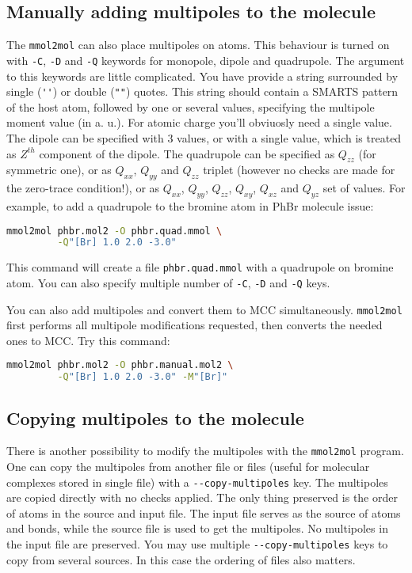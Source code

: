 \documentclass[10pt,a4paper]{article}
\begin{document}
\subsection{Manually adding multipoles to the molecule}
The \lstinline{mmol2mol} can also place multipoles on atoms. This behaviour is turned on 
with \lstinline{-C}, \lstinline{-D} and \lstinline{-Q} keywords for monopole, dipole and 
quadrupole. The argument to this keywords are little complicated. You have provide a 
string surrounded by single (\lstinline{''}) or double (\lstinline{""}) quotes. This 
string should contain a SMARTS pattern of the host atom, followed by one or several 
values, specifying the multipole moment value (in a. u.). For atomic charge you'll 
obviuosly need a single value. The dipole can be specified with 3 values, or with a single
value, which is treated as $Z^{th}$ component of the dipole. The quadrupole can be specified 
as $Q_{zz}$ (for symmetric one), or as $Q_{xx}$, $Q_{yy}$ and $Q_{zz}$ triplet 
(however no checks are made for the zero-trace condition!), or as 
$Q_{xx}$, $Q_{yy}$, $Q_{zz}$, $Q_{xy}$, $Q_{xz}$ and $Q_{yz}$ set of values. For example, 
to add a quadrupole to the bromine atom in PhBr molecule issue:
\begin{lstlisting}[language=bash]
mmol2mol phbr.mol2 -O phbr.quad.mmol \
         -Q"[Br] 1.0 2.0 -3.0"
\end{lstlisting}
This command will create a file \lstinline{phbr.quad.mmol} with a quadrupole on 
bromine atom. You can also specify multiple number of \lstinline{-C}, 
\lstinline{-D} and \lstinline{-Q} keys.

You can also add multipoles and convert them to MCC simultaneously. \lstinline{mmol2mol}
first performs all multipole modifications requested, then converts the needed ones to MCC.
Try this command:
\begin{lstlisting}[language=bash]
mmol2mol phbr.mol2 -O phbr.manual.mol2 \
         -Q"[Br] 1.0 2.0 -3.0" -M"[Br]"
\end{lstlisting}

\subsection{Copying multipoles to the molecule}
There is another possibility to modify the multipoles with the \lstinline{mmol2mol} 
program. One can copy the multipoles from another file or files (useful for molecular 
complexes stored in single file) with a \lstinline{--copy-multipoles} key. The multipoles 
are copied directly with no checks applied. The only thing preserved is the order of atoms 
in the source and input file. The input file serves as the source of atoms and bonds, while 
the source file is used to get the multipoles. No multipoles in the input file are preserved.
You may use multiple \lstinline{--copy-multipoles} keys 
to copy from several sources. In this case the ordering of files also matters.
\end{document}
